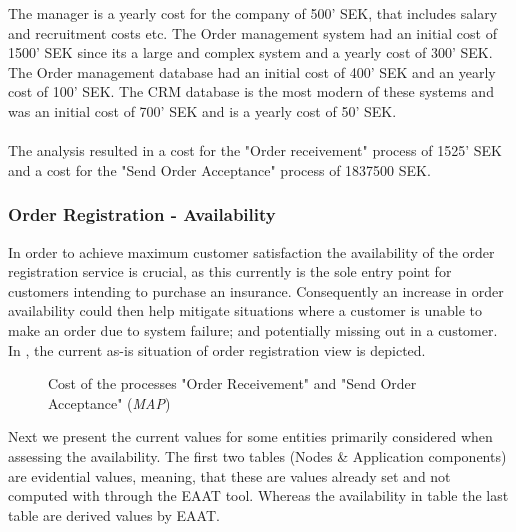 The manager is a yearly cost for the company of 500' SEK, that includes salary and recruitment costs etc. The Order management system had an initial cost of 1500' SEK since its a large and complex system and a yearly cost of 300' SEK. The Order management database had an initial cost of 400' SEK and an yearly cost of 100' SEK. The CRM database is the most modern of these systems and was an initial cost of 700' SEK and is a yearly cost of 50' SEK.\\\\
%
The analysis resulted in a cost for the "Order receivement" process of 1525' SEK and a cost for the "Send Order Acceptance" process of 1837500 SEK.
%
\subsubsection{Order Registration - Availability}
\label{sec:order_availability}
In order to achieve maximum customer satisfaction the availability of the order registration service is crucial, as this currently is the sole entry point for customers intending to purchase an insurance. Consequently an increase in order availability could then help mitigate situations where a customer is unable to make an order due to system failure; and potentially missing out in a customer. In , the current as-is situation of order registration view is depicted.
\begin{center}
	\begin{figure}[H]
		\centering
		\setlength\fboxsep{7pt}
		\setlength\fboxrule{0.5pt}
		\caption{Cost of the processes "Order Receivement" and "Send Order Acceptance" (\emph{MAP})}
		\label{fig:map_order_availability}
	\end{figure}
\end{center}
Next we present the current values for some entities primarily considered when assessing the availability. The first two tables (Nodes \& Application components) are evidential values, meaning, that these are values already set and not computed with through the EAAT tool. Whereas the availability in table the last table are derived values by EAAT.

%

